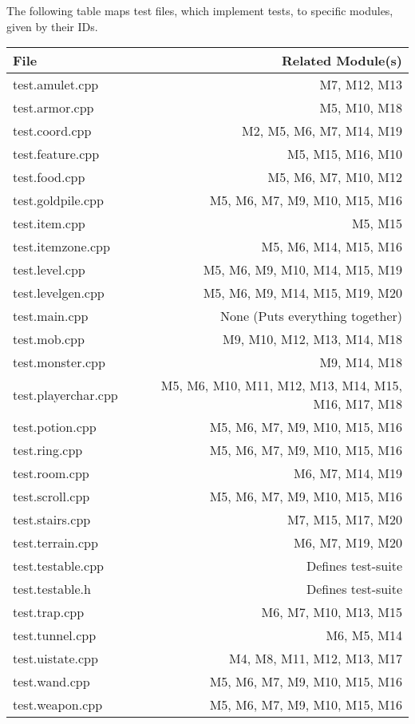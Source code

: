 \documentclass[12pt, titlepage]{article}
\begin{document}

	The following table maps test files, which implement tests, to specific modules, given by their IDs.\\

	\begin{table}[h!]
		\caption{\bf Test-Module Trace}
		\label{TblMH}
		\bigskip
		\centering
		\begin{longtable}{lr}
			\hline
			File & Related Module(s)\\
			\hline
			test.amulet.cpp 		& M7, M12, M13\\
			test.armor.cpp 			& M5, M10, M18\\
			test.coord.cpp 			& M2, M5, M6, M7, M14, M19\\
			test.feature.cpp 		& M5, M15, M16, M10\\
			test.food.cpp 			& M5, M6, M7, M10, M12\\
			test.goldpile.cpp 		& M5, M6, M7, M9, M10, M15, M16\\
			test.item.cpp 			& M5, M15\\
			test.itemzone.cpp 		& M5, M6, M14, M15, M16\\
			test.level.cpp 			& M5, M6, M9, M10, M14, M15, M19\\
			test.levelgen.cpp 		& M5, M6, M9, M14, M15, M19, M20\\
			test.main.cpp 			& None (Puts everything together)\\
			test.mob.cpp 			& M9, M10, M12, M13, M14, M18\\
			test.monster.cpp 		& M9, M14, M18\\
			test.playerchar.cpp 	& M5, M6, M10, M11, M12, M13, M14, M15, M16, M17, M18\\
			test.potion.cpp 		& M5, M6, M7, M9, M10, M15, M16\\
			test.ring.cpp 			& M5, M6, M7, M9, M10, M15, M16\\
			test.room.cpp 			& M6, M7, M14, M19\\
			test.scroll.cpp 		& M5, M6, M7, M9, M10, M15, M16\\
			test.stairs.cpp 		& M7, M15, M17, M20\\
			test.terrain.cpp 		& M6, M7, M19, M20\\
			test.testable.cpp 		& Defines test-suite\\
			test.testable.h 		& Defines test-suite\\
			test.trap.cpp 			& M6, M7, M10, M13, M15\\
			test.tunnel.cpp 		& M6, M5, M14\\
			test.uistate.cpp 		& M4, M8, M11, M12, M13, M17\\
			test.wand.cpp 			& M5, M6, M7, M9, M10, M15, M16\\
			test.weapon.cpp 		& M5, M6, M7, M9, M10, M15, M16\\
			\hline
		\end{longtable}
	\end{table}
\end{document}
